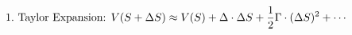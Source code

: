 \documentclass[preview]{standalone}
\begin{document}
\begin{align*}
\special{dvisvgm:raw <g id='unique000'>}1. \text{ Taylor Expansion: } V(S+\Delta S) \approx V(S) + \Delta \cdot \Delta S + \frac{1}{2}\Gamma \cdot (\Delta S)^2 + \cdots\special{dvisvgm:raw </g>}
\end{align*}
\end{document}
